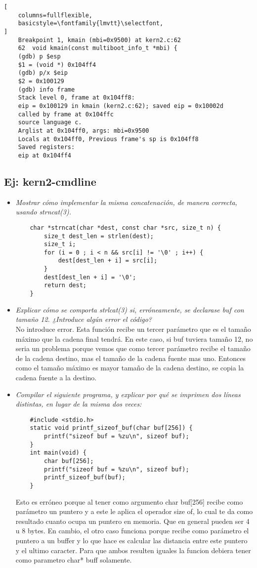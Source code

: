 \documentclass[a4paper, 12pt]{article}
\begin{document}
\begin{itemize}
\begin{lstlisting}[
	columns=fullflexible,
	basicstyle=\fontfamily{lmvtt}\selectfont,
]
	Breakpoint 1, kmain (mbi=0x9500) at kern2.c:62
	62	void kmain(const multiboot_info_t *mbi) {
	(gdb) p $esp
	$1 = (void *) 0x104ff4
	(gdb) p/x $eip
	$2 = 0x100129
	(gdb) info frame
	Stack level 0, frame at 0x104ff8:
	eip = 0x100129 in kmain (kern2.c:62); saved eip = 0x10002d
	called by frame at 0x104ffc
	source language c.
	Arglist at 0x104ff0, args: mbi=0x9500
	Locals at 0x104ff0, Previous frame's sp is 0x104ff8
	Saved registers:
	eip at 0x104ff4
\end{lstlisting}
		\end{itemize}
		\subsection{Ej: kern2-cmdline}
		\begin{itemize}
			\item \textit{Mostrar cómo implementar la misma concatenación, de
			manera correcta, usando strncat(3).}
\begin{lstlisting}
	char *strncat(char *dest, const char *src, size_t n) {
		size_t dest_len = strlen(dest);
		size_t i;
		for (i = 0 ; i < n && src[i] != '\0' ; i++) {
			dest[dest_len + i] = src[i];
		}
		dest[dest_len + i] = '\0';
		return dest;
	}
\end{lstlisting}
			\item \textit{Explicar cómo se comporta strlcat(3) si, erróneamente,
			se declarase buf con tamaño 12. ¿Introduce algún error el código?\\}
			No introduce error. Esta función recibe un tercer parámetro que es
			el tamaño máximo que la cadena final tendrá. En este caso, si buf
			tuviera tamaño 12, no seria un problema porque vemos que como tercer
			parámetro recibe el tamaño de la cadena destino, mas el tamaño de la
			cadena fuente mas uno. Entonces como el tamaño máximo es mayor
			tamaño de la cadena destino, se copia la cadena fuente a la destino.
			\item \textit{Compilar el siguiente programa, y explicar por qué se
			imprimen dos líneas distintas, en lugar de la misma dos veces:\\}
\begin{lstlisting}
	#include <stdio.h>
	static void printf_sizeof_buf(char buf[256]) {
		printf("sizeof buf = %zu\n", sizeof buf);
	}
	int main(void) {
		char buf[256];
		printf("sizeof buf = %zu\n", sizeof buf);
		printf_sizeof_buf(buf);
	}
\end{lstlisting}
			Esto es erróneo porque al tener como argumento char buf[256]
			recibe como parámetro un puntero y a este le aplica el operador
			size of, lo cual te da como resultado cuanto ocupa un puntero en
			memoria. Que en general pueden ser 4 u 8 bytes. En cambio, el otro
			caso funciona porque recibe como parámetro el puntero a un buffer y
			lo que hace es calcular las distancia entre este puntero y el
			ultimo caracter. Para que ambos resulten iguales la funcion
			debiera tener como parametro char* buff solamente.
		\end{itemize}
\end{document}
